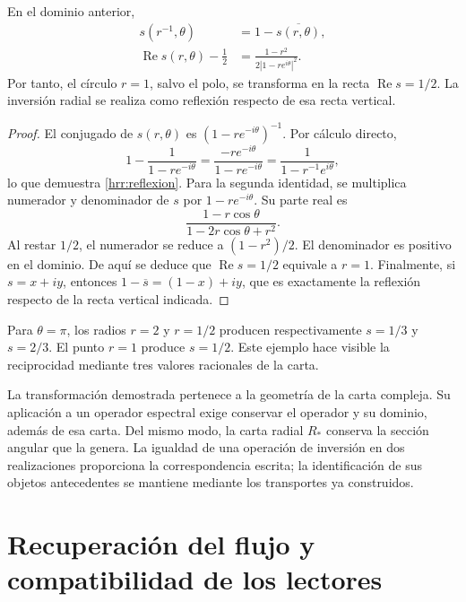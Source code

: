 \begin{proposition}
\label{hrr:reflexion-compleja}
En el dominio anterior,
\begin{align}
 s(r^{-1},\theta)&=1-\overline{s(r,\theta)},
 \label{hrr:reflexion}\\
 \operatorname{Re}s(r,\theta)-\frac12
 &=\frac{1-r^2}{2|1-re^{i\theta}|^2}.
 \label{hrr:reflexion-parte-real}
\end{align}
Por tanto, el círculo \(r=1\), salvo el polo, se transforma en la
recta \(\operatorname{Re}s=1/2\). La inversión radial se realiza
como reflexión respecto de esa recta vertical.
\end{proposition}
\begin{proof}
El conjugado de \(s(r,\theta)\) es
\((1-re^{-i\theta})^{-1}\). Por cálculo directo,
\[
 1-\frac1{1-re^{-i\theta}}
 =\frac{-re^{-i\theta}}{1-re^{-i\theta}}
 =\frac1{1-r^{-1}e^{i\theta}},
\]
lo que demuestra \eqref{hrr:reflexion}. Para la segunda identidad,
se multiplica numerador y denominador de \(s\) por
\(1-re^{-i\theta}\). Su parte real es
\[
 \frac{1-r\cos\theta}{1-2r\cos\theta+r^2}.
\]
Al restar \(1/2\), el numerador se reduce a \((1-r^2)/2\).
El denominador es positivo en el dominio. De aquí se deduce que
\(\operatorname{Re}s=1/2\) equivale a \(r=1\). Finalmente,
si \(s=x+iy\), entonces \(1-\overline s=(1-x)+iy\), que
es exactamente la reflexión respecto de la recta vertical indicada.
\end{proof}

Para \(\theta=\pi\), los radios \(r=2\) y \(r=1/2\)
producen respectivamente \(s=1/3\) y \(s=2/3\). El punto
\(r=1\) produce \(s=1/2\). Este ejemplo hace visible la
reciprocidad mediante tres valores racionales de la carta.

La transformación demostrada pertenece a la geometría de la carta
compleja. Su aplicación a un operador espectral exige conservar el
operador y su dominio, además de esa carta. Del mismo modo, la carta
radial \(R_*\) conserva la sección angular que la genera. La igualdad
de una operación de inversión en dos realizaciones proporciona la
correspondencia escrita; la identificación de sus objetos antecedentes
se mantiene mediante los transportes ya construidos.

\section{Recuperación del flujo y compatibilidad de los lectores}
\label{hrr:archivo}

